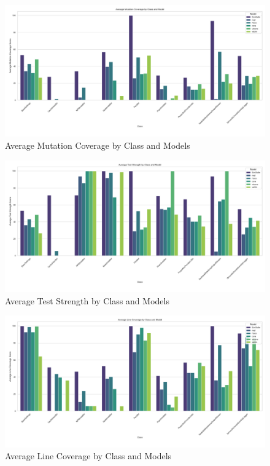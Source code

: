 \begin{figure}[H]
\centering
\includegraphics[width=1\textwidth]{images/mutation_coverage_avg.png}
\caption{Average Mutation Coverage by Class and Models}
\label{fig:mutation_coverage}
\end{figure}

\begin{figure}[H]
\centering
\includegraphics[width=1\textwidth]{images/test_strength_avg.png}
\caption{Average Test Strength by Class and Models}
\label{fig:test_strength}
\end{figure}

\begin{figure}[H]
\centering
\includegraphics[width=1\textwidth]{images/line_coverage_avg.png}
\caption{Average Line Coverage by Class and Models}
\label{fig:line_coverage}
\end{figure}


